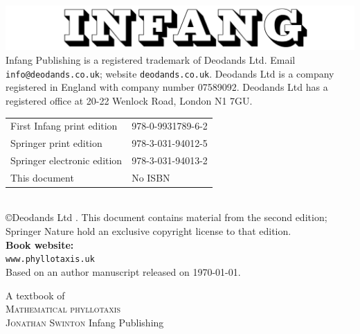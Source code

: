 \thispagestyle{titlingpage}
{
\mbox{}\vspace{\fill}
		\centering	
		\includegraphics[width=.6\jfigwidth]{./Figures/infang.jpg}
		\\[10ex]
		Infang Publishing is a registered trademark of Deodands Ltd. 		Email \texttt{info@deodands.co.uk}; website \texttt{deodands.co.uk}.
		Deodands Ltd is a company registered in England with company number 07589092. 
		Deodands Ltd has a registered office at
		20-22 Wenlock Road, London N1 7GU.
		\\[10ex] %
		\begin{tabular}{ll}
First Infang print edition & 978-0-9931789-6-2 
\\
Springer print edition & 978-3-031-94012-5
\\
Springer electronic edition & 978-3-031-94013-2
\\
This document & No ISBN
		\end{tabular}
%
{}
		\\[10ex]
		\copyright Deodands Ltd \jPublicationYear. This document contains material from the second edition; Springer Nature hold an exclusive copyright license to that edition.
		\\[20ex]
		\textbf{Book website:}
		\\
		\texttt{www.phyllotaxis.uk}
		\\[10ex]
		{Based on an author manuscript  \jdraftnumber{} released on \today.}
}
\newpage

\thispagestyle{titlingpage}
{
	\centering
	{\Huge A textbook of }
	\\[3ex]
	{\HUGE\jEmphasisColour	\textsc{Mathematical phyllotaxis}}\\
	\vfill
	{\Huge	\scshape Jonathan Swinton}
	\vfill
	{\Large	Infang Publishing}
	\\[3ex]
	{\Large \textsc{\jPublicationYear}
		\\}
}



